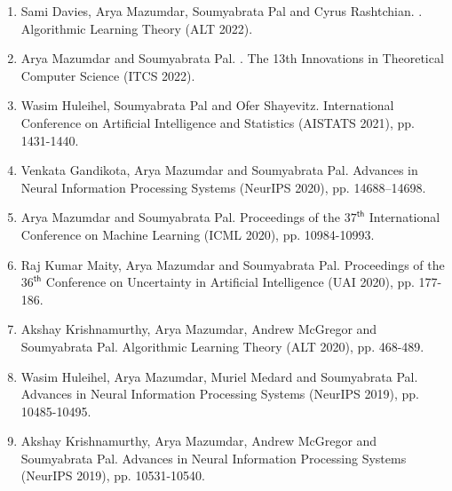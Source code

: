 \documentclass[9pt]{article}
\begin{document}
\begin{enumerate}
\item Sami Davies, Arya Mazumdar, Soumyabrata Pal and Cyrus Rashtchian. \href{https://arxiv.org/abs/2109.01064}{}. Algorithmic Learning Theory (ALT 2022).

\item Arya Mazumdar and Soumyabrata Pal. \href{https://arxiv.org/pdf/2107.09091}{}. The 13th Innovations in Theoretical Computer Science (ITCS 2022).

\item Wasim Huleihel, Soumyabrata Pal and Ofer Shayevitz.  \href{https://arxiv.org/abs/2101.12506}{} International Conference on Artificial Intelligence and Statistics (AISTATS 2021), pp. 1431-1440.

\item Venkata Gandikota, Arya Mazumdar and Soumyabrata Pal. \href{https://arxiv.org/abs/2010.12087}{}  Advances in Neural Information Processing Systems (NeurIPS 2020), pp. 14688--14698.

\item Arya Mazumdar and Soumyabrata Pal. \href{https://arxiv.org/abs/2006.16406}{} Proceedings of the $37^{\mathsf{th}}$ International Conference on Machine Learning (ICML 2020), pp. 10984-10993. 
\item Raj Kumar Maity, Arya Mazumdar and Soumyabrata Pal. \href{https://arxiv.org/abs/1806.11542}{} Proceedings of the $36^{\mathsf{th}}$ Conference on Uncertainty in Artificial Intelligence (UAI 2020), pp. 177-186.
 
\item Akshay Krishnamurthy, Arya Mazumdar, Andrew McGregor and Soumyabrata Pal. \href{https://arxiv.org/abs/2001.06776}{} Algorithmic Learning Theory (ALT 2020), pp. 468-489. 
   
 \item Wasim Huleihel, Arya Mazumdar, Muriel Medard and Soumyabrata Pal. \href{https://arxiv.org/abs/1910.12490}{} Advances in Neural Information Processing Systems (NeurIPS 2019), pp. 10485-10495. 
\item Akshay Krishnamurthy, Arya Mazumdar, Andrew McGregor and Soumyabrata Pal. \href{https://arxiv.org/abs/1910.14106}{}   Advances in Neural Information Processing Systems (NeurIPS 2019), pp. 10531-10540. 


\end{enumerate}
\end{document}
